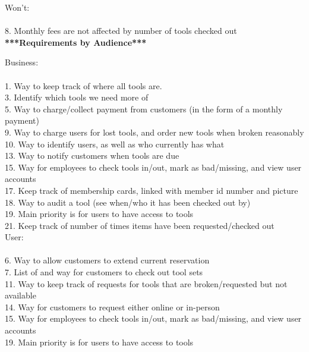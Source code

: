 \documentclass[12pt,letterpaper]{article}
\begin{document}
Won't:\\\\
8. Monthly fees are not affected by number of tools checked out\\

\newpage
\textbf{***Requirements by Audience***}

Business:\\\\
1. Way to keep track of where all tools are.\\
3. Identify which tools we need more of\\
5. Way to charge/collect payment from customers (in the form of a monthly payment)\\
9. Way to charge users for lost tools, and order new tools when broken reasonably\\
10. Way to identify users, as well as who currently has what\\
13. Way to notify customers when tools are due\\
15. Way for employees to check tools in/out, mark as bad/missing, and view user accounts\\
17. Keep track of membership cards, linked with member id number and picture\\
18. Way to audit a tool (see when/who it has been checked out by)\\
19. Main priority is for users to have access to tools\\
21. Keep track of number of times items have been requested/checked out\\

User:\\\\
6. Way to allow customers to extend current reservation\\
7. List of and way for customers to check out tool sets\\
11. Way to keep track of requests for tools that are broken/requested but not available\\
14. Way for customers to request either online or in-person\\
15. Way for employees to check tools in/out, mark as bad/missing, and view user accounts\\
19. Main priority is for users to have access to tools\\
\end{document}

